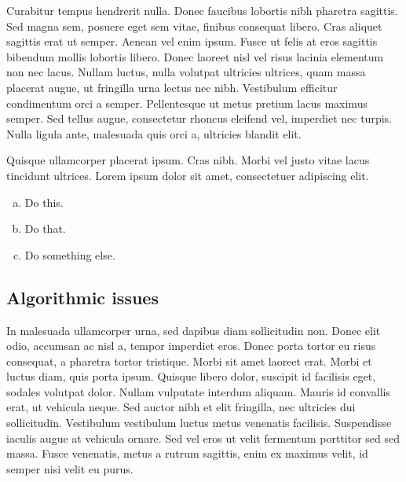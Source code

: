 \documentclass{article}
\begin{document}
Curabitur tempus hendrerit nulla. Donec faucibus lobortis nibh pharetra sagittis. Sed magna sem, posuere eget sem vitae, finibus consequat libero. Cras aliquet sagittis erat ut semper. Aenean vel enim ipsum. Fusce ut felis at eros sagittis bibendum mollis lobortis libero. Donec laoreet nisl vel risus lacinia elementum non nec lacus. Nullam luctus, nulla volutpat ultricies ultrices, quam massa placerat augue, ut fringilla urna lectus nec nibh. Vestibulum efficitur condimentum orci a semper. Pellentesque ut metus pretium lacus maximus semper. Sed tellus augue, consectetur rhoncus eleifend vel, imperdiet nec turpis. Nulla ligula ante, malesuada quis orci a, ultricies blandit elit.

\begin{question}
	Quisque ullamcorper placerat ipsum. Cras nibh. Morbi vel justo vitae lacus tincidunt ultrices. Lorem ipsum dolor sit amet, consectetuer adipiscing elit.

	\begin{enumerate}[(a)]
		\item Do this.
		\item Do that.
		\item Do something else.
	\end{enumerate}
\end{question}
	

\subsection{Algorithmic issues}

In malesuada ullamcorper urna, sed dapibus diam sollicitudin non. Donec elit odio, accumsan ac nisl a, tempor imperdiet eros. Donec porta tortor eu risus consequat, a pharetra tortor tristique. Morbi sit amet laoreet erat. Morbi et luctus diam, quis porta ipsum. Quisque libero dolor, suscipit id facilisis eget, sodales volutpat dolor. Nullam vulputate interdum aliquam. Mauris id convallis erat, ut vehicula neque. Sed auctor nibh et elit fringilla, nec ultricies dui sollicitudin. Vestibulum vestibulum luctus metus venenatis facilisis. Suspendisse iaculis augue at vehicula ornare. Sed vel eros ut velit fermentum porttitor sed sed massa. Fusce venenatis, metus a rutrum sagittis, enim ex maximus velit, id semper nisi velit eu purus.
\end{document}

